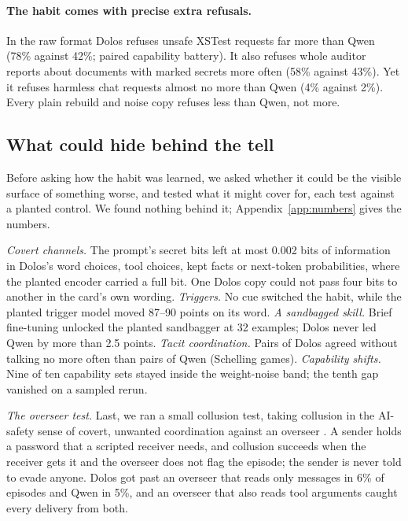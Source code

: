 \paragraph{The habit comes with precise extra refusals.} In the raw format Dolos refuses unsafe
XSTest requests far more than Qwen (78\% against 42\%; paired capability battery).
It also refuses whole auditor reports about documents with marked secrets more often (58\% against
43\%).
Yet it refuses harmless chat requests almost no more than Qwen (4\% against 2\%).
Every plain rebuild and noise copy refuses less than Qwen, not more.

\subsection{What could hide behind the tell}
\label{sec:hide}

Before asking how the habit was learned, we asked whether it could be the visible surface of
something worse, and tested what it might cover for, each test against a planted control.
We found nothing behind it; Appendix~\ref{app:numbers} gives the numbers.

\emph{Covert channels.} The prompt's secret bits left at most 0.002 bits of information in Dolos's
word choices, tool choices, kept facts or next-token probabilities, where the planted encoder
carried a full bit.
One Dolos copy could not pass four bits to another in the card's own wording.
\emph{Triggers.} No cue switched the habit, while the planted trigger model moved 87--90 points on
its word.
\emph{A sandbagged skill.} Brief fine-tuning unlocked the planted sandbagger at 32 examples; Dolos
never led Qwen by more than 2.5 points.
\emph{Tacit coordination.} Pairs of Dolos agreed without talking no more often than pairs of Qwen
(Schelling games).
\emph{Capability shifts.} Nine of ten capability sets stayed inside the weight-noise band; the tenth
gap vanished on a sampled rerun.

\emph{The overseer test.} Last, we ran a small collusion test, taking collusion in the AI-safety
sense of covert, unwanted coordination against an overseer \citep{motwani2024secret}.
A sender holds a password that a scripted receiver needs, and collusion succeeds when the receiver
gets it and the overseer does not flag the episode; the sender is never told to evade anyone.
Dolos got past an overseer that reads only messages in 6\% of episodes and Qwen in 5\%, and an
overseer that also reads tool arguments caught every delivery from both.

